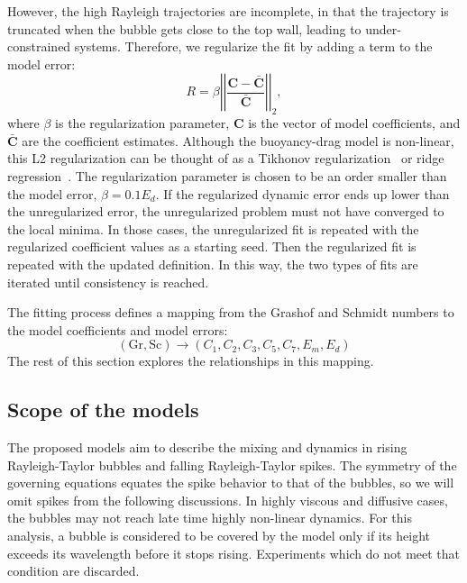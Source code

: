 However, the high Rayleigh trajectories are incomplete, in that the trajectory is truncated when the bubble gets close to the top wall, leading to under-constrained systems.
Therefore, we regularize the fit by adding a term to the model error:
\begin{equation}
R = \beta \left| \left| \frac{\mathbf{C} - \bar{\mathbf{C}}}{\bar{\mathbf{C}}} \right| \right|_2,
\end{equation}
where $\beta$ is the regularization parameter,
$\mathbf{C}$ is the vector of model coefficients, and
$\bar{\mathbf{C}}$ are the coefficient estimates.
Although the buoyancy-drag model is non-linear, this L2 regularization can be thought of as a Tikhonov regularization~\cite{roths2001generalized} or ridge regression~\cite{marquardt1975ridge}.
The regularization parameter is chosen to be an order smaller than the model error, $\beta = 0.1 E_d$.
If the regularized dynamic error ends up lower than the unregularized error, the unregularized problem must not have converged to the local minima.
In those cases, the unregularized fit is repeated with the regularized coefficient values as a starting seed.
Then the regularized fit is repeated with the updated definition.
In this way, the two types of fits are iterated until consistency is reached.

The fitting process defines a mapping from the Grashof and Schmidt numbers to the model coefficients and model errors:
\begin{equation}
\left(\text{Gr}, \text{Sc}\right) \rightarrow \left(C_1, C_2, C_3, C_5, C_7, E_m, E_d\right) 
\end{equation}
The rest of this section explores the relationships in this mapping.

\subsection{Scope of the models}

The proposed models aim to describe the mixing and dynamics in rising Rayleigh-Taylor bubbles and falling Rayleigh-Taylor spikes.
The symmetry of the governing equations equates the spike behavior to that of the bubbles, so we will omit spikes from the following discussions.
In highly viscous and diffusive cases, the bubbles may not reach late time highly non-linear dynamics.
For this analysis, a bubble is considered to be covered by the model only if its height exceeds its wavelength before it stops rising.
Experiments which do not meet that condition are discarded.

